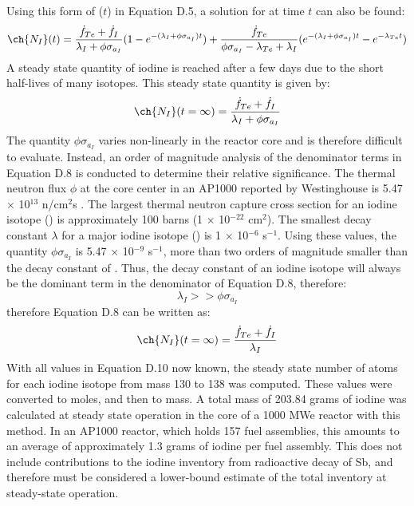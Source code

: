 \documentclass[a4paper,12pt,twoside]{report}
\begin{document}
Using this form of ($t$) in Equation D.5, a solution for  at time $t$ can also be found:
\begin{equation}
\ch{N_{I}}(t) = \frac{\dot{f}_{Te} + \dot{f}_{I}}{\lambda_{I} + \phi\sigma_{a_{I}}}(1 - e^{-(\lambda_{I} + \phi\sigma_{a_{I}})t}) + \frac{\dot{f}_{Te}}{\phi\sigma_{a_{I}} - \lambda_{Te} + \lambda_{I}}(e^{-(\lambda_{I} + \phi\sigma_{a_{I}})t} - e^{-\lambda_{Te}t})
\end{equation}
A steady state quantity of iodine is reached after a few days due to the short half-lives of many isotopes. This steady state quantity is given by:
\begin{equation}
\ch{N_{I}}(t=\infty) = \frac{\dot{f}_{Te} + \dot{f}_{I}}{\lambda_{I} + \phi\sigma_{a_{I}}}
\end{equation}
The quantity $\phi\sigma_{a_{I}}$ varies non-linearly in the reactor core and is therefore difficult to evaluate. Instead, an order of magnitude analysis of the denominator terms in Equation D.8 is conducted to determine their relative significance. The thermal neutron flux $\phi$ at the core center in an AP1000 reported by Westinghouse is 5.47 $\times$ 10$^{13}$ n/cm$^{2}$s \cite{stefani2015neutronic}. The largest thermal neutron capture cross section for an iodine isotope () is approximately 100 barns (1 $\times$ 10$^{-22}$ cm$^{2}$). The smallest decay constant $\lambda$ for a major iodine isotope () is 1 $\times$ 10$^{-6}$ s$^{-1}$. Using these values, the quantity $\phi\sigma_{a_{I}}$ is 5.47 $\times$ 10$^{-9}$ s$^{-1}$, more than two orders of magnitude smaller than the decay constant of . Thus, the decay constant of an iodine isotope will always be the dominant term in the denominator of Equation D.8, therefore:
\begin{equation}
\lambda_{I} >> \phi\sigma_{a_{I}}
\end{equation}
therefore Equation D.8 can be written as:
\begin{equation}
\ch{N_{I}}(t=\infty) = \frac{\dot{f}_{Te} + \dot{f}_{I}}{\lambda_{I}}
\end{equation}
With all values in Equation D.10 now known, the steady state number of atoms for each iodine isotope from mass 130 to 138 was computed. These values were converted to moles, and then to mass. A total mass of 203.84 grams of iodine was calculated at steady state operation in the core of a 1000 MWe reactor with this method. In an AP1000 reactor, which holds 157 fuel assemblies, this amounts to an average of approximately 1.3 grams of iodine per fuel assembly. This does not include contributions to the iodine inventory from radioactive decay of Sb, and therefore must be considered a lower-bound estimate of the total inventory at steady-state operation.
\end{document}
